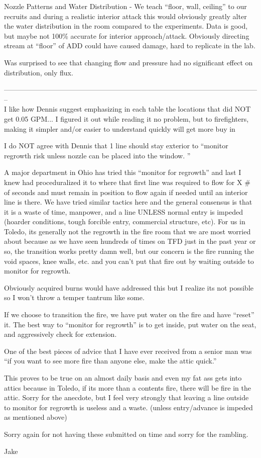 \documentclass[12pt,oneside]{book}
\begin{document}
\begin{appendix}
Nozzle Patterns and Water Distribution - We teach ``floor, wall, ceiling'' to our recruits and during a realistic interior attack this would obviously greatly alter the water distribution in the room compared to the experiments.  Data is good, but maybe not 100\% accurate for interior approach/attack. Obviously directing stream at ``floor'' of ADD could have caused damage, hard to replicate in the lab. 

Was surprised to see that changing flow and pressure had no significant effect on distribution, only flux. 

-------------------------------------------------------------------------------------------------------------- \\

I like how Dennis suggest emphasizing in each table the locations that did NOT get 0.05 GPM... I figured it out while reading it no problem, but to firefighters, making it simpler and/or easier to understand quickly will get more buy in

I do NOT agree with Dennis that 1 line should stay exterior to ``monitor regrowth risk unless nozzle can be placed into the window.  ''

A major department in Ohio has tried this ``monitor for regrowth'' and last I knew had proceduralized it to where that first line was required to flow for X \# of seconds and must remain in position to flow again if needed until an interior line is there.  We have tried similar tactics here and the general consensus is that it is a waste of time, manpower, and a line UNLESS normal entry is impeded (hoarder conditions, tough forcible entry, commercial structure, etc).  For us in Toledo, its generally not the regrowth in the fire room that we are most worried about because as we have seen hundreds of times on TFD just in the past year or so, the transition works pretty damn well, but our concern is the fire running the void spaces, knee walls, etc. and you can't put that fire out by waiting outside to monitor for regrowth.

Obviously acquired burns would have addressed this but I realize its not possible so I won't throw a temper tantrum like some.

If we choose to transition the fire, we have put water on the fire and have ``reset'' it.  The best way to ``monitor for regrowth'' is to get inside, put water on the seat, and aggressively check for extension.  

One of the best pieces of advice that I have ever received from a senior man was ``if you want to see more fire than anyone else, make the attic quick.''  

This proves to be true on an almost daily basis and even my fat ass gets into attics because in Toledo, if its more than a contents fire, there will be fire in the attic.  Sorry for the anecdote, but I feel very strongly that leaving a line outside to monitor for regrowth is useless and a waste. (unless entry/advance is impeded as mentioned above)


Sorry again for not having these submitted on time and sorry for the rambling.

Jake

\end{appendix}
\end{document}
